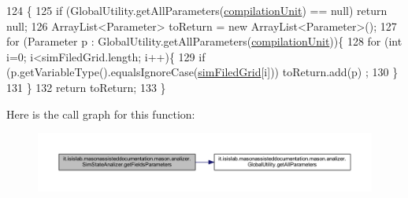\begin{DoxyCode}
124                                                      \{
125         \textcolor{keywordflow}{if} (GlobalUtility.getAllParameters(\hyperlink{classit_1_1isislab_1_1masonassisteddocumentation_1_1mason_1_1analizer_1_1_sim_state_analizer_a56f6f2a78ed4ed2aca4b727f945a32ed}{compilationUnit}) == null) \textcolor{keywordflow}{return} null;
126         ArrayList<Parameter> toReturn = \textcolor{keyword}{new} ArrayList<Parameter>();
127         \textcolor{keywordflow}{for} (Parameter p : GlobalUtility.getAllParameters(\hyperlink{classit_1_1isislab_1_1masonassisteddocumentation_1_1mason_1_1analizer_1_1_sim_state_analizer_a56f6f2a78ed4ed2aca4b727f945a32ed}{compilationUnit}))\{
128                 \textcolor{keywordflow}{for} (\textcolor{keywordtype}{int} i=0; i<simFiledGrid.length; i++)\{
129                     \textcolor{keywordflow}{if} (p.getVariableType().equalsIgnoreCase(\hyperlink{classit_1_1isislab_1_1masonassisteddocumentation_1_1mason_1_1analizer_1_1_sim_state_analizer_af21adec0b3c44f8bfc09cd83d6eeb917}{simFiledGrid}[i]))  toReturn.add(p)
      ;
130                 \}               
131         \}
132         \textcolor{keywordflow}{return} toReturn;
133     \}   
\end{DoxyCode}


Here is the call graph for this function\-:
\nopagebreak
\begin{figure}[H]
\begin{center}
\leavevmode
\includegraphics[width=350pt]{classit_1_1isislab_1_1masonassisteddocumentation_1_1mason_1_1analizer_1_1_sim_state_analizer_a7ae9354f9db7c1455dac04271d21fad0_cgraph}
\end{center}
\end{figure}


